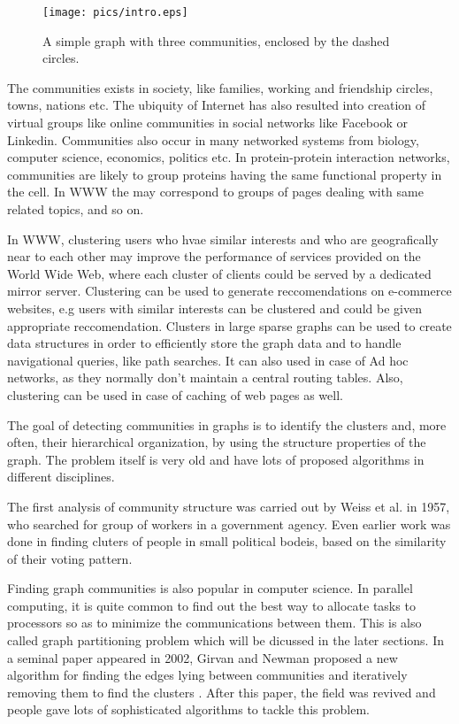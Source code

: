 \documentclass[letterpaper]{article}
\begin{document}
\begin{figure}
\texttt{[image: pics/intro.eps]}
\caption{A simple graph with three communities, enclosed by the dashed circles.}
\label{fig:bipart}
\end{figure}

The communities exists in society, like families, working and friendship
circles, towns, nations etc.  The ubiquity of Internet has also resulted into
creation of virtual groups like online communities in social networks like
Facebook or Linkedin. Communities also occur in many networked systems from
biology, computer science, economics, politics etc.  In protein-protein
interaction networks, communities are likely to group proteins having the same
functional property in the cell. In WWW the may correspond to groups of pages
dealing with same related topics, and so on.


In WWW, clustering users who hvae similar interests and who are geografically
near to each other may improve the performance of services provided on the
World Wide Web, where each cluster of clients could be served by a dedicated
mirror server. Clustering can be used  to generate reccomendations on
e-commerce websites, e.g users with similar interests can be clustered and
could be given appropriate reccomendation.  Clusters in large sparse graphs can
be used to create data structures in order to efficiently store the graph data
and to handle navigational queries, like path searches. It can also used in
case of Ad hoc networks, as they normally don't maintain a central routing
tables. Also, clustering can be used in case of caching of web pages as well.

The goal of detecting communities in graphs is to identify the clusters and,
more often, their hierarchical organization, by using the structure properties
of the graph. The problem itself is very old and have lots of proposed
algorithms in different disciplines.

The first analysis of community structure was carried out by Weiss et al. in
1957, who searched for group of workers in a government agency. Even earlier
work was done in finding cluters of people in small political bodeis, based on
the similarity of their voting pattern.

Finding graph communities is also popular in computer science. In parallel
computing, it is quite common to find out the best way to allocate tasks to
processors so as to minimize the communications between them. This is also
called graph partitioning problem which will be dicussed in the later sections.
In a seminal paper appeared in 2002, Girvan and Newman proposed a new algorithm
for finding the edges lying between communities and iteratively removing them
to find the clusters \cite{new2002}. After this paper, the field was revived and people
gave lots of sophisticated algorithms to tackle this problem.
\end{document}
